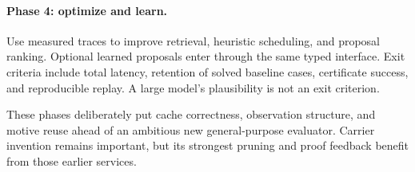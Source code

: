 \documentclass[11pt,a4paper]{article}
\theoremstyle{definition}
\theoremstyle{remark}
\begin{document}
\paragraph{Phase 4: optimize and learn.}
Use measured traces to improve retrieval, heuristic scheduling, and proposal
ranking. Optional learned proposals enter through the same typed interface.
Exit criteria include total latency, retention of solved baseline cases,
certificate success, and reproducible replay. A large model's plausibility is
not an exit criterion.

These phases deliberately put cache correctness, observation structure, and
motive reuse ahead of an ambitious new general-purpose evaluator. Carrier
invention remains important, but its strongest pruning and proof feedback
benefit from those earlier services.
\end{document}
